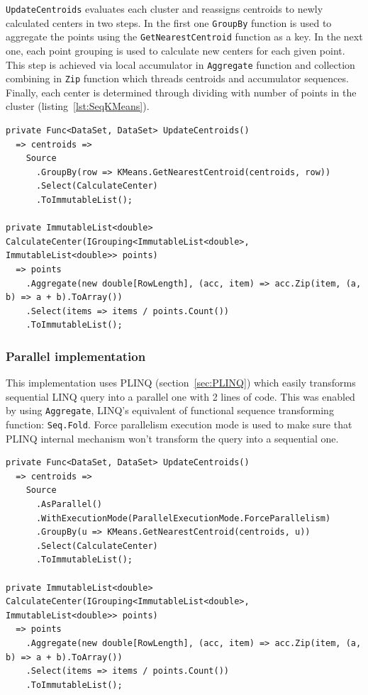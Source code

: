 \texttt{UpdateCentroids} evaluates each cluster and reassigns centroids to newly calculated centers in two steps. In the first one \texttt{GroupBy} function is used to aggregate the points using the \texttt{GetNearestCentroid} function as a key. In the next one, each point grouping is used to calculate new centers for each given point. This step is achieved via local accumulator in \texttt{Aggregate} function and collection combining in \texttt{Zip} function which threads centroids and accumulator sequences. Finally, each center is determined through dividing with number of points in the cluster (listing~\ref{lst:SeqKMeans}).


\begin{lstlisting}[style=sharpcstyle, caption={Sequential k-means algorithm}, label={lst:SeqKMeans},
numbers=none, xleftmargin=0pt,framexleftmargin=0pt,framexrightmargin=0pt,framexbottommargin=0pt]
private Func<DataSet, DataSet> UpdateCentroids()
  => centroids =>
    Source
      .GroupBy(row => KMeans.GetNearestCentroid(centroids, row))
      .Select(CalculateCenter)
      .ToImmutableList();

private ImmutableList<double> CalculateCenter(IGrouping<ImmutableList<double>, ImmutableList<double>> points) 
  => points
    .Aggregate(new double[RowLength], (acc, item) => acc.Zip(item, (a, b) => a + b).ToArray())
    .Select(items => items / points.Count())
    .ToImmutableList();
\end{lstlisting}

\subsubsection{Parallel implementation}

This implementation uses PLINQ (section~\ref{sec:PLINQ}) which easily transforms sequential LINQ query into a parallel one with 2 lines of code.
This was enabled by using \texttt{Aggregate}, LINQ's equivalent of functional sequence transforming function: \texttt{Seq.Fold}. Force parallelism execution mode is used to make sure that PLINQ internal mechanism won't transform the query into a sequential one.

\begin{lstlisting}[style=sharpcstyle, caption={Parallel k-means algorithm}, label={lst:ParKMeans},
numbers=none, xleftmargin=0pt,framexleftmargin=0pt,framexrightmargin=0pt,framexbottommargin=0pt]
private Func<DataSet, DataSet> UpdateCentroids()
  => centroids =>
    Source
      .AsParallel()
      .WithExecutionMode(ParallelExecutionMode.ForceParallelism)
      .GroupBy(u => KMeans.GetNearestCentroid(centroids, u))
      .Select(CalculateCenter)
      .ToImmutableList();

private ImmutableList<double> CalculateCenter(IGrouping<ImmutableList<double>, ImmutableList<double>> points)
  => points
    .Aggregate(new double[RowLength], (acc, item) => acc.Zip(item, (a, b) => a + b).ToArray())
    .Select(items => items / points.Count())
    .ToImmutableList();
\end{lstlisting}

